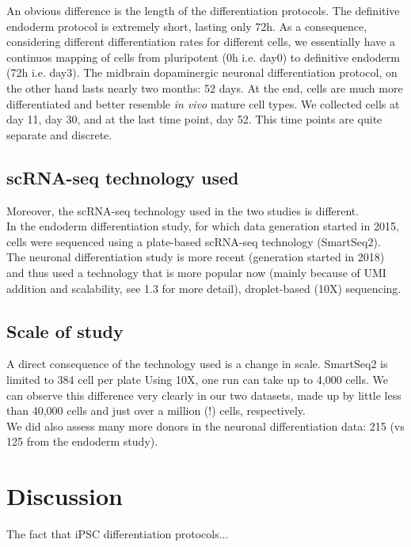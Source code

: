 An obvious difference is the length of the differentiation protocols.
The definitive endoderm protocol is extremely short, lasting only 72h.
As a consequence, considering different differentiation rates for different cells, we essentially have a continuos mapping of cells from pluripotent (0h i.e. day0) to definitive endoderm (72h i.e. day3).
The midbrain dopaminergic neuronal differentiation protocol, on the other hand lasts nearly two months: 52 days.
At the end, cells are much more differentiated and better resemble \textit{in vivo }mature cell types.
We collected cells at day 11, day 30, and at the last time point, day 52.
This time points are quite separate and discrete.


\subsection{scRNA-seq technology used}

Moreover, the scRNA-seq technology used in the two studies is different.\\

In the endoderm differentiation study, for which data generation started in 2015, cells were sequenced using a plate-based scRNA-seq technology (SmartSeq2).\\

The neuronal differentiation study is more recent (generation started in 2018) and thus used a technology that is more popular now (mainly because of UMI addition and scalability, see 1.3 for more detail), droplet-based (10X) sequencing.

\subsection{Scale of study}
A direct consequence of the technology used is a change in scale.
SmartSeq2 is limited to 384 cell per plate
Using 10X, one run can take up to 4,000 cells.
We can observe this difference very clearly in our two datasets, made up by little less than 40,000 cells and just over a million (!) cells, respectively.\\

We did also assess many more donors in the neuronal differentiation data: 215 (vs 125 from the endoderm study).

\section{Discussion}

The fact that iPSC differentiation protocols...